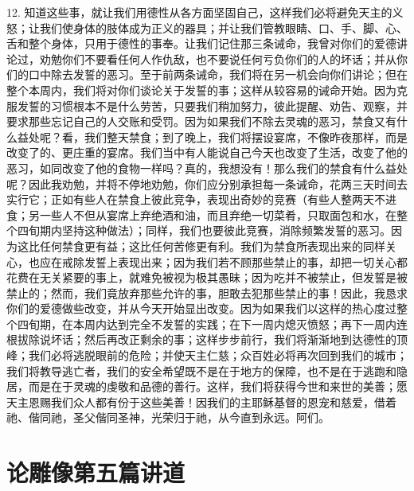 12. 知道这些事，就让我们用德性从各方面坚固自己，这样我们必将避免天主的义怒；让我们使身体的肢体成为正义的器具；并让我们管教眼睛、口、手、脚、心、舌和整个身体，只用于德性的事奉。让我们记住那三条诫命，我曾对你们的爱德讲论过，劝勉你们不要看任何人作仇敌，也不要说任何亏负你们的人的坏话；并从你们的口中除去发誓的恶习。至于前两条诫命，我们将在另一机会向你们讲论；但在整个本周内，我们将对你们谈论关于发誓的事；这样从较容易的诫命开始。因为克服发誓的习惯根本不是什么劳苦，只要我们稍加努力，彼此提醒、劝告、观察，并要求那些忘记自己的人交账和受罚。因为如果我们不除去灵魂的恶习，禁食又有什么益处呢？看，我们整天禁食；到了晚上，我们将摆设宴席，不像昨夜那样，而是改变了的、更庄重的宴席。我们当中有人能说自己今天也改变了生活，改变了他的恶习，如同改变了他的食物一样吗？真的，我想没有！那么我们的禁食有什么益处呢？因此我劝勉，并将不停地劝勉，你们应分别承担每一条诫命，花两三天时间去实行它；正如有些人在禁食上彼此竞争，表现出奇妙的竞赛（有些人整两天不进食；另一些人不但从宴席上弃绝酒和油，而且弃绝一切菜肴，只取面包和水，在整个四旬期内坚持这种做法）；同样，我们也要彼此竞赛，消除频繁发誓的恶习。因为这比任何禁食更有益；这比任何苦修更有利。我们为禁食所表现出来的同样关心，也应在戒除发誓上表现出来；因为我们若不顾那些禁止的事，却把一切关心都花费在无关紧要的事上，就难免被视为极其愚昧；因为吃并不被禁止，但发誓是被禁止的；然而，我们竟放弃那些允许的事，胆敢去犯那些禁止的事！因此，我恳求你们的爱德做些改变，并从今天开始显出改变。因为如果我们以这样的热心度过整个四旬期，在本周内达到完全不发誓的实践；在下一周内熄灭愤怒；再下一周内连根拔除说坏话；然后再改正剩余的事；这样步步前行，我们将渐渐地到达德性的顶峰；我们必将逃脱眼前的危险；并使天主仁慈；众百姓必将再次回到我们的城市；我们将教导逃亡者，我们的安全希望既不是在于地方的保障，也不是在于逃跑和隐居，而是在于灵魂的虔敬和品德的善行。这样，我们将获得今世和来世的美善；愿天主恩赐我们众人都有份于这些美善！因我们的主耶稣基督的恩宠和慈爱，借着祂、偕同祂，圣父偕同圣神，光荣归于祂，从今直到永远。阿们。\par



\section{论雕像第五篇讲道}

